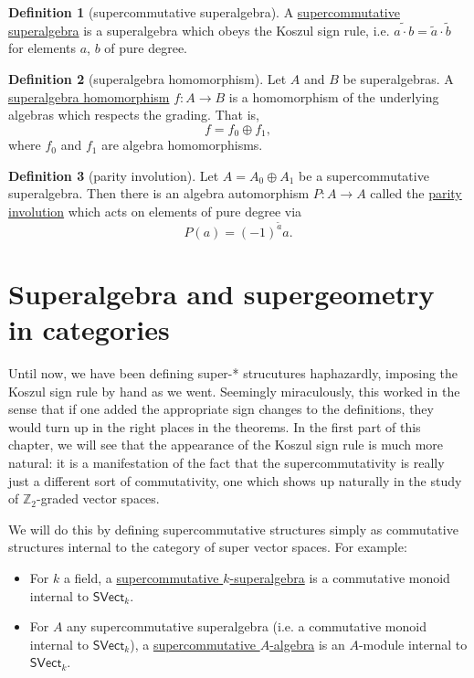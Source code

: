 \documentclass[a4paper,10pt]{scrreprt}
\newcommand{\Z}{\mathbb{Z}}
\newcommand{\defn}[1]{\ul{#1}}
\theoremstyle{definition}
\newtheorem{definition}{Definition}[section]
\theoremstyle{plain}
\theoremstyle{remark}
\begin{document}
\begin{definition}[supercommutative superalgebra]
  \label{def:supercommutativesuperalgebra}
  A \defn{supercommutative superalgebra} is a superalgebra which obeys the Koszul sign rule, i.e.  $\widetilde{a \cdot b} = \tilde{a} \cdot \tilde{b}$ for elements $a$, $b$ of pure degree.
\end{definition}

\begin{definition}[superalgebra homomorphism]
  \label{def:superalgebrahomomorphism}
  Let $A$ and $B$ be superalgebras. A \defn{superalgebra homomorphism} $f\colon A \to B$ is a homomorphism of the underlying algebras which respects the grading. That is, 
  \begin{equation*}
    f = f_{0} \oplus f_{1},
  \end{equation*}
  where $f_{0}$ and $f_{1}$ are algebra homomorphisms.
\end{definition}

\begin{definition}[parity involution]
  \label{def:parityinvolution}
  Let $A = A_{0} \oplus A_{1}$ be a supercommutative superalgebra. Then there is an algebra automorphism $P\colon A\to A$ called the \defn{parity involution} which acts on elements of pure degree via
  \begin{equation*}
    P(a) = (-1)^{\tilde{a}}a.
  \end{equation*}
\end{definition}

\chapter{Superalgebra and supergeometry in categories}
Until now, we have been defining super-* strucutures haphazardly, imposing the Koszul sign rule by hand as we went. Seemingly miraculously, this worked in the sense that if one added the appropriate sign changes to the definitions, they would turn up in the right places in the theorems. In the first part of this chapter, we will see that the appearance of the Koszul sign rule is much more natural: it is a manifestation of the fact that the supercommutativity is really just a different sort of commutativity, one which shows up naturally in the study of $\Z_{2}$-graded vector spaces.

We will do this by defining supercommutative structures simply as commutative structures internal to the category of super vector spaces. For example:
\begin{itemize}
  \item For $k$ a field, a \defn{supercommutative $k$-superalgebra} is a commutative monoid internal to $\mathsf{SVect}_{k}$.

  \item For $A$ any supercommutative superalgebra (i.e. a commutative monoid internal to $\mathsf{SVect}_{k}$), a \defn{supercommutative $A$-algebra} is an $A$-module internal to $\mathsf{SVect}_{k}$.
\end{itemize}
\end{document}
